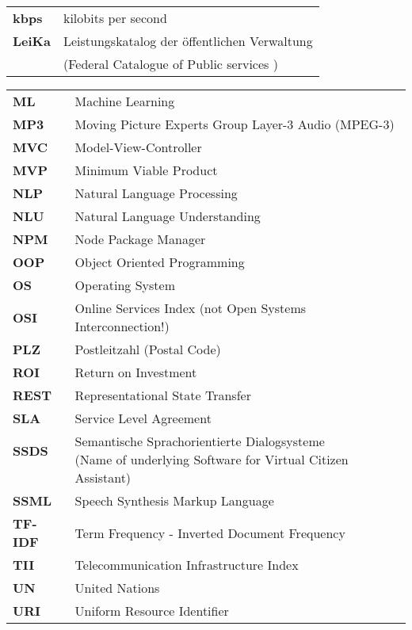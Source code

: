 \begin{flushleft}
\begin{tabular}{ll}
\textbf{kbps}	&	kilobits per second\\

\textbf{LeiKa}	&	Leistungskatalog der öffentlichen Verwaltung \\
& (Federal Catalogue of Public %
services )\\


\end{tabular}
\begin{tabular}{ll}


\textbf{ML}		&	Machine Learning\\
\textbf{MP3}	&	Moving Picture Experts Group Layer-3 Audio (MPEG-3)\\
\textbf{MVC}	&	Model-View-Controller\\
\textbf{MVP}	&	Minimum Viable Product\\



\textbf{NLP}	&	Natural Language Processing\\
\textbf{NLU}	&	Natural Language Understanding\\
\textbf{NPM}	&	Node Package Manager\\

\textbf{OOP}		&	Object Oriented Programming\\
\textbf{OS}		&	Operating System\\
\textbf{OSI}	&	Online Services Index (not Open Systems Interconnection!)\\
\textbf{PLZ}	&	Postleitzahl (Postal Code)\\

\textbf{ROI}	&	Return on Investment\\
\textbf{REST}	&	Representational State Transfer\\
\textbf{SLA}	&	Service Level Agreement\\
\shortstack[l]{\textbf{SSDS}\\ \textcolor{white}{x}}	&	\shortstack[l]{Semantische Sprachorientierte Dialogsysteme \\ (Name of underlying Software for Virtual Citizen Assistant)} \\
\textbf{SSML}	&	Speech Synthesis Markup Language\\

\textbf{TF-IDF}	&	Term Frequency - Inverted Document Frequency\\
\textbf{TII}	&	Telecommunication Infrastructure Index\\

\textbf{UN}		&	United Nations\\
\textbf{URI}		&	Uniform Resource Identifier\\



\end{tabular}
\end{flushleft}
